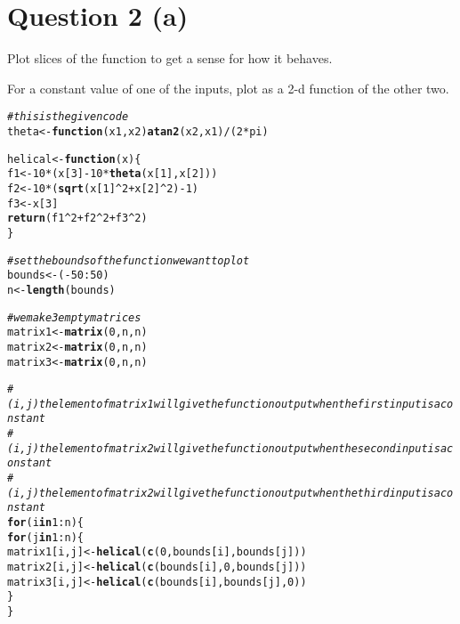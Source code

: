 \documentclass[english]{article}\usepackage[]{graphicx}\usepackage[]{color}
\makeatletter
\newcommand{\hlnum}[1]{\textcolor[rgb]{0.686,0.059,0.569}{#1}}%
\newcommand{\hlcom}[1]{\textcolor[rgb]{0.678,0.584,0.686}{\textit{#1}}}%
\newcommand{\hlopt}[1]{\textcolor[rgb]{0,0,0}{#1}}%
\newcommand{\hlstd}[1]{\textcolor[rgb]{0.345,0.345,0.345}{#1}}%
\newcommand{\hlkwa}[1]{\textcolor[rgb]{0.161,0.373,0.58}{\textbf{#1}}}%
\newcommand{\hlkwb}[1]{\textcolor[rgb]{0.69,0.353,0.396}{#1}}%
\newcommand{\hlkwc}[1]{\textcolor[rgb]{0.333,0.667,0.333}{#1}}%
\newcommand{\hlkwd}[1]{\textcolor[rgb]{0.737,0.353,0.396}{\textbf{#1}}}%
\newenvironment{kframe}{%
 \def\at@end@of@kframe{}%
 \ifinner\ifhmode%
  \def\at@end@of@kframe{\end{minipage}}%
  \begin{minipage}{\columnwidth}%
 \fi\fi%
 \def\FrameCommand##1{\hskip\@totalleftmargin \hskip-\fboxsep
 \colorbox{shadecolor}{##1}\hskip-\fboxsep
     \hskip-\linewidth \hskip-\@totalleftmargin \hskip\columnwidth}%
 \MakeFramed {\advance\hsize-\width
   \@totalleftmargin\z@ \linewidth\hsize
   \@setminipage}}%
 {\par\unskip\endMakeFramed%
 \at@end@of@kframe}
\newenvironment{knitrout}{}{} %
\makeatother
\begin{document}
\section*{Question 2 (a)}

Plot slices of the function to get a sense for how it behaves.

For a constant value of one of the inputs, plot as a 2-d function
of the other two.

\begin{knitrout}
\color{fgcolor}\begin{kframe}
\begin{alltt}
\hlcom{# this is the given code}
\hlstd{theta} \hlkwb{<-} \hlkwa{function}\hlstd{(}\hlkwc{x1}\hlstd{,}\hlkwc{x2}\hlstd{)} \hlkwd{atan2}\hlstd{(x2, x1)}\hlopt{/}\hlstd{(}\hlnum{2}\hlopt{*}\hlstd{pi)}

\hlstd{helical} \hlkwb{<-} \hlkwa{function}\hlstd{(}\hlkwc{x}\hlstd{)\{}
  \hlstd{f1} \hlkwb{<-} \hlnum{10}\hlopt{*}\hlstd{(x[}\hlnum{3}\hlstd{]} \hlopt{-} \hlnum{10}\hlopt{*}\hlkwd{theta}\hlstd{(x[}\hlnum{1}\hlstd{],x[}\hlnum{2}\hlstd{]))}
  \hlstd{f2} \hlkwb{<-} \hlnum{10}\hlopt{*}\hlstd{(}\hlkwd{sqrt}\hlstd{(x[}\hlnum{1}\hlstd{]}\hlopt{^}\hlnum{2}\hlopt{+}\hlstd{x[}\hlnum{2}\hlstd{]}\hlopt{^}\hlnum{2}\hlstd{)}\hlopt{-}\hlnum{1}\hlstd{)}
  \hlstd{f3} \hlkwb{<-} \hlstd{x[}\hlnum{3}\hlstd{]}
  \hlkwd{return}\hlstd{(f1}\hlopt{^}\hlnum{2}\hlopt{+}\hlstd{f2}\hlopt{^}\hlnum{2}\hlopt{+}\hlstd{f3}\hlopt{^}\hlnum{2}\hlstd{)}
\hlstd{\}}

\hlcom{# set the bounds of the function we want to plot}
\hlstd{bounds} \hlkwb{<-} \hlstd{(}\hlopt{-}\hlnum{50}\hlopt{:}\hlnum{50}\hlstd{)}
\hlstd{n} \hlkwb{<-} \hlkwd{length}\hlstd{(bounds)}

\hlcom{# we make 3 empty matrices}
\hlstd{matrix1} \hlkwb{<-} \hlkwd{matrix}\hlstd{(}\hlnum{0}\hlstd{,n,n)}
\hlstd{matrix2} \hlkwb{<-} \hlkwd{matrix}\hlstd{(}\hlnum{0}\hlstd{,n,n)}
\hlstd{matrix3} \hlkwb{<-} \hlkwd{matrix}\hlstd{(}\hlnum{0}\hlstd{,n,n)}

\hlcom{# (i,j)th element of matrix1 will give the function output when the first input is a constant }
\hlcom{# (i,j)th element of matrix2 will give the function output when the second input is a constant }
\hlcom{# (i,j)th element of matrix2 will give the function output when the third input is a constant }
\hlkwa{for}\hlstd{(i} \hlkwa{in} \hlnum{1}\hlopt{:}\hlstd{n)\{}
  \hlkwa{for}\hlstd{(j} \hlkwa{in} \hlnum{1}\hlopt{:}\hlstd{n)\{}
    \hlstd{matrix1[i,j]} \hlkwb{<-} \hlkwd{helical}\hlstd{(}\hlkwd{c}\hlstd{(}\hlnum{0}\hlstd{,bounds[i], bounds[j]))}
    \hlstd{matrix2[i,j]} \hlkwb{<-} \hlkwd{helical}\hlstd{(}\hlkwd{c}\hlstd{(bounds[i],}\hlnum{0}\hlstd{,bounds[j]))}
    \hlstd{matrix3[i,j]} \hlkwb{<-} \hlkwd{helical}\hlstd{(}\hlkwd{c}\hlstd{(bounds[i], bounds[j],}\hlnum{0}\hlstd{))}
  \hlstd{\}}
\hlstd{\}}


\end{alltt}
\end{kframe}
\end{knitrout}
\end{document}

